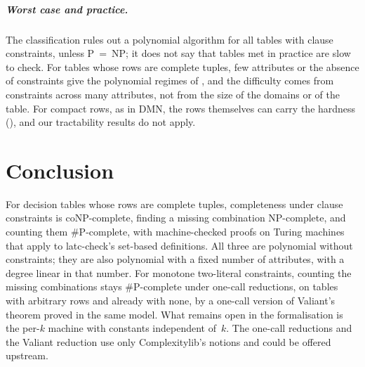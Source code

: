 \documentclass[a4paper,UKenglish,cleveref,autoref,thm-restate]{lipics-v2021}
\begin{document}
\subparagraph*{Worst case and practice.}
The classification rules out a polynomial algorithm for all tables with clause constraints,
unless P~=~NP; it does not say that tables met in practice are slow to check. For tables whose
rows are complete tuples, few attributes or the absence of constraints give the polynomial
regimes of , and the difficulty comes from constraints across many
attributes, not from the size of the domains or of the table. For compact rows, as in DMN, the
rows themselves can carry the hardness (), and our tractability results do not
apply.

\section{Conclusion}
\label{sec:conclusion}

For decision tables whose rows are complete tuples, completeness under clause constraints is
coNP-complete, finding a missing combination NP-complete, and counting them \#P-complete, with
machine-checked proofs on Turing machines that apply to latc-check's set-based definitions. All
three are polynomial without constraints; they are also polynomial with a fixed number of
attributes, with a degree linear in that number. For monotone two-literal constraints, counting
the missing combinations stays \#P-complete under one-call reductions, on tables with arbitrary
rows and already with none, by a one-call version of Valiant's theorem proved in the same model. What remains
open in the formalisation is the per-$k$ machine with constants independent of~$k$. The one-call
reductions and the Valiant reduction use only Complexitylib's notions and could be offered
upstream.

\end{document}
